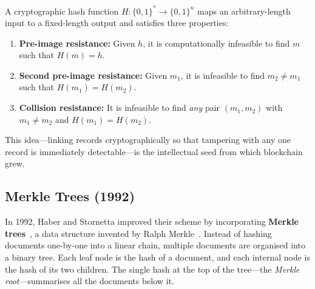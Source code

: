 \begin{definition}
\label{def:hash}
A cryptographic hash function $H: \{0,1\}^* \to \{0,1\}^n$ maps an arbitrary-length input to a fixed-length output and satisfies three properties:
\begin{enumerate}
    \item \textbf{Pre-image resistance:} Given $h$, it is computationally infeasible to find $m$ such that $H(m) = h$.
    \item \textbf{Second pre-image resistance:} Given $m_1$, it is infeasible to find $m_2 \neq m_1$ such that $H(m_1) = H(m_2)$.
    \item \textbf{Collision resistance:} It is infeasible to find \emph{any} pair $(m_1, m_2)$ with $m_1 \neq m_2$ and $H(m_1) = H(m_2)$.
\end{enumerate}
\end{definition}

This idea---linking records cryptographically so that tampering with any one record is immediately detectable---is the intellectual seed from which blockchain grew.

\subsection{Merkle Trees (1992)}

In 1992, Haber and Stornetta improved their scheme by incorporating \textbf{Merkle trees}~\cite{haber1992merkle}, a data structure invented by Ralph Merkle~\cite{merkle1980protocols}. Instead of hashing documents one-by-one into a linear chain, multiple documents are organised into a binary tree. Each leaf node is the hash of a document, and each internal node is the hash of its two children. The single hash at the top of the tree---the \emph{Merkle root}---summarises all the documents below it.

